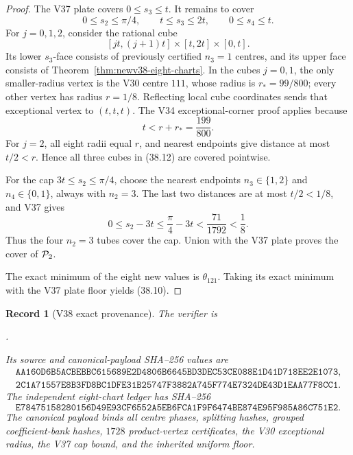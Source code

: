\documentclass[11pt,oneside]{article}
\newtheorem{record}[theorem]{Record}
\theoremstyle{definition}
\theoremstyle{remark}
\begin{document}
\begin{proof}
The V37 plate covers \(0\le s_3\le t\).  It remains to cover
\[
 0\le s_2\le\pi/4,\qquad
 t\le s_3\le2t,\qquad0\le s_4\le t.                   \tag{38.11}
\]
For \(j=0,1,2\), consider the rational cube
\[
 [jt,(j+1)t]\times[t,2t]\times[0,t].                  \tag{38.12}
\]
Its lower \(s_3\)-face consists of previously certified \(n_3=1\)
centres, and its upper face consists of
Theorem~\ref{thm:newv38-eight-charts}.  In the cubes \(j=0,1\),
the only smaller-radius vertex is the V30 centre \(111\), whose
radius is \(r_*=99/800\); every other vertex has radius \(r=1/8\).
Reflecting local cube coordinates sends that exceptional vertex to
\((t,t,t)\).  The V34 exceptional-corner proof applies because
\[
 t<r+r_*=\frac{199}{800}.                             \tag{38.13}
\]
For \(j=2\), all eight radii equal \(r\), and nearest endpoints give
distance at most \(t/2<r\).  Hence all three cubes in (38.12) are
covered pointwise.

For the cap \(3t\le s_2\le\pi/4\), choose the nearest endpoints
\(n_3\in\{1,2\}\) and \(n_4\in\{0,1\}\), always with \(n_2=3\).
The last two distances are at most \(t/2<1/8\), and V37 gives
\[
 0\le s_2-3t
 \le\frac{\pi}{4}-3t
 <\frac{71}{1792}<\frac18.                            \tag{38.14}
\]
Thus the four \(n_2=3\) tubes cover the cap.  Union with the V37
plate proves the cover of \({\cal P}_2\).

The exact minimum of the eight new values is \(\theta_{121}\).
Taking its exact minimum with the V37 plate floor yields
(38.10).
\end{proof}

\begin{record}[V38 exact provenance]
\label{rec:newv38-provenance}
The verifier is
\begin{center}
\footnotesize
{}.
\end{center}
Its source and canonical-payload SHA--256 values are
\[
\begin{gathered}
\texttt{AA160D6B5ACBEBBC615689E2D4806B6645BD3DEC53CE088E1D41D718EE2E1073},\\
\texttt{2C1A71557E8B3FD8BC1DFE31B25747F3882A745F774E7324DE43D1EAA77F8CC1}.
\end{gathered}                                         \tag{38.15}
\]
The independent eight-chart ledger has SHA--256
\[
\texttt{E78475158280156D49E93CF6552A5EB6FCA1F9F6474BE874E95F985A86C751E2}.
                                                               \tag{38.16}
\]
The canonical payload binds all centre phases, splitting hashes,
grouped coefficient-bank hashes, \(1728\) product-vertex
certificates, the V30 exceptional radius, the V37 cap bound, and
the inherited uniform floor.
\end{record}
\end{document}
